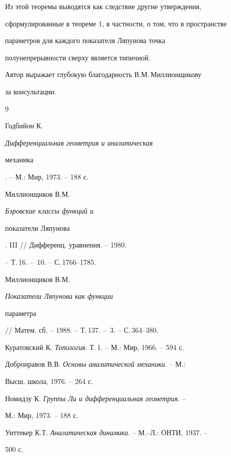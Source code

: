  


Из этой теоремы выводятся как следствие другие утверждения, 


сформулированные в теореме 1, в частности, о том, что в пространстве 


параметров для каждого показателя Ляпунова точка 


полунепрерывности сверху является типичной. 


 


Автор выражает глубокую благодарность В.М.\,Миллионщикову 


за консультации. 


 


\begin{thebibliography}{9} 


 




Годбийон К. {\em Дифференциальная геометрия и аналитическая 


механика}. -- М.: Мир, 1973. -- 188 с. 




Миллионщиков В.М. {\em Бэровские классы функций и 


показатели Ляпунова}. III // Дифференц. уравнения. -- 1980. 


-- Т.\,16. -- \No\,10. -- С.\,1766--1785. 




Миллионщиков В.М. {\em Показатели Ляпунова как функции 


параметра} // Матем. сб. -- 1988. -- Т.\,137. -- \No\,3. -- С.\,364--380. 




Куратовский К. {\em Топология}. Т.\,1. -- М.: Мир, 1966. -- 594 с. 




Добронравов В.В. {\em Основы аналитической механики}. -- М.: 


Высш. школа, 1976. -- 264 с. 




Номидзу К. {\em Группы Ли и дифференциальная геометрия}. -- 


М.: Мир, 1973. -- 188 с. 




Уиттекер К.Т. {\em Аналитическая динамика}. -- М.--Л.: ОНТИ, 1937. -- 


500 с. 


 


\end{thebibliography} 


 


\vskip 2cm 


 








 


\label{end} 


 


